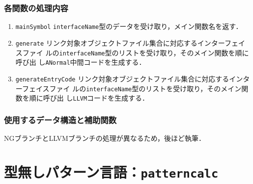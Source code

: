 \documentclass{jbook}
\newif\ifjp
\newcommand{\txt}[2]{#1}
\newcommand{\code}[1]{\mbox{\large\tt #1}}
\begin{document}
\subsection{各関数の処理内容}
\begin{enumerate}
\item \code{mainSymbol}
	\code{interfaceName}型のデータを受け取り，メイン関数名を返す．
\item \code{generate}
リンク対象オブジェクトファイル集合に対応するインターフェイスファイ
ルの\code{interfaceName}型のリストを受け取り，そのメイン関数を順に呼び出
し\code{ANormal}中間コードを生成する．
\item \code{generateEntryCode}
リンク対象オブジェクトファイル集合に対応するインターフェイスファイ
ルの\code{interfaceName}型のリストを受け取り，そのメイン関数を順に呼び出
し\code{LLVM}コードを生成する．
\end{enumerate}

\subsection{使用するデータ構造と補助関数}

	NGブランチとLLVMブランチの処理が異なるため，後ほど執筆．

\else%
\fi%



% 
\chapter{\txt
{型無しパターン言語：\code{patterncalc}}
{The untyped pattern language : \code{patterncalc}}
}
\label{chap:PatternCalc}

\ifjp%
\begin{enumerate}
\item ソースロケーションとファイル構成
ディレクトリ \code{src/compiler/patterncalc/main}下の以下のファイルからなる．
\begin{itemize}
\item \code{PatternCalc.ppg} 型無しパターン言語のソース言語定義ファイル
\item \code{PatternCalcInterface.ppg} 型無しパターン言語のインターフェイス言語定義ファイル
\end{itemize}

\item 他モジュールとのインターフェイス
\begin{itemize}
\item 構文論的評価モジュール\code{src/compiler/elaborater}の出力言語．
\item 名前評価・モジュールコンパイルモジュール\code{src/compiler/nameevaluation}の入力言語．
\end{itemize}
\end{enumerate}
\else%
\fi%
\end{document}
